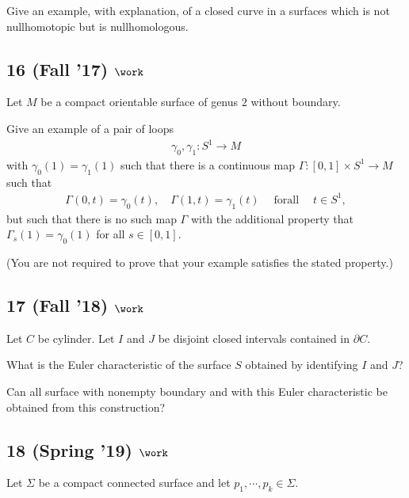 Give an example, with explanation, of a closed curve in a surfaces which
is not nullhomotopic but is nullhomologous.

\hypertarget{fall-17-work-4}{%
\subsection{\texorpdfstring{16 (Fall '17)
\(\work\)}{16 (Fall '17) \textbackslash work}}\label{fall-17-work-4}}

Let \(M\) be a compact orientable surface of genus \(2\) without
boundary.

Give an example of a pair of loops
\begin{align*}\gamma_0 , \gamma_1 : S^1 \to M\end{align*}
with \(\gamma_0 (1) = \gamma_1 (1)\) such that there is a continuous map
\(\Gamma: [0, 1] \times S^1 \to M\) such that
\begin{align*}
\Gamma(0, t) = \gamma_0 (t), \quad \Gamma(1, t) = \gamma_1 (t) {\quad \operatorname{for all} \quad} t \in S^1
,\end{align*}
but such that there is no such map \(\Gamma\) with the additional
property that \(\Gamma_s (1) = \gamma_0 (1)\) for all \(s \in [0, 1]\).

(You are not required to prove that your example satisfies the stated
property.)

\hypertarget{fall-18-work-7}{%
\subsection{\texorpdfstring{17 (Fall '18)
\(\work\)}{17 (Fall '18) \textbackslash work}}\label{fall-18-work-7}}

Let \(C\) be cylinder. Let \(I\) and \(J\) be disjoint closed intervals
contained in \(\partial C\).

What is the Euler characteristic of the surface \(S\) obtained by
identifying \(I\) and \(J\)?

Can all surface with nonempty boundary and with this Euler
characteristic be obtained from this construction?

\hypertarget{spring-19-work-2}{%
\subsection{\texorpdfstring{18 (Spring '19)
\(\work\)}{18 (Spring '19) \textbackslash work}}\label{spring-19-work-2}}

Let \(\Sigma\) be a compact connected surface and let
\(p_1, \cdots , p_k \in \Sigma\).

